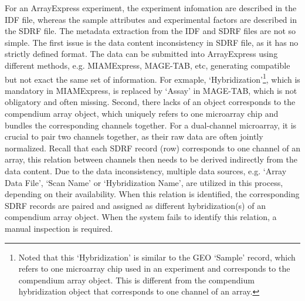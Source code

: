 For an ArrayExpress experiment, the experiment infomation are described
in the IDF file, whereas the sample attributes and experimental factors
are described in the SDRF file.
%
The metadata extraction from the IDF and SDRF files are not so simple.
%
The first issue is the data content inconsistency in SDRF file, as it has
no strictly defined format.
%
The data can be submitted into ArrayExpress using different methods,
e.g. MIAMExpress, MAGE-TAB, etc, generating compatible but not exact the
same set of information.
%
For exmaple, `Hybridization'\footnote{Noted that this `Hybridization' is
  similar to the GEO `Sample' record, which refers to one microarray chip
  used in an experiment and corresponds to the compendium array object.
  This is different from the compendium hybridization object that
  corresponds to one channel of an array.}, which is mandatory in
MIAMExpress, is replaced by `Assay' in MAGE-TAB, which is not obligatory
and often missing.
%
%
Second, there lacks of an object corresponds to the compendium array
object, which uniquely refers to one microarray chip and bundles the
corresponding channels together.
%
For a dual-channel microarray, it is crucial to pair two channels
together, as their raw data are often jointly normalized.
%
Recall that each SDRF record (row) corresponds to one channel of an array,
this relation between channels then needs to be derived indirectly from the
data content.
%
Due to the data inconsistency, multiple data sources, e.g. `Array Data
File', `Scan Name' or `Hybridization Name', are utilized in this process,
depending on their availability.
%
When this relation is identified, the corresponding SDRF records are
paired and assigned as different hybridization(s) of an compendium array
object.
%
When the system fails to identify this relation, a manual inspection is
required.

